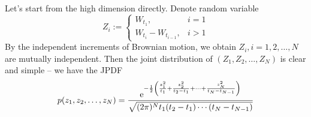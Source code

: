 \documentclass{homework}
\begin{document}
    \problem
    \begin{subproblem}[\roman*)]
        \item
        Let's start from the high dimension directly.
        Denote random variable
        \[Z_i:=\begin{cases}
            W_{t_1},&i=1\\
            W_{t_i}-W_{t_{i-1}},&i>1
        \end{cases}\]
        By the independent increments of Brownian motion, we
        obtain $Z_i,i=1,2,\ldots,N$ are mutually independent.
        Then the joint distribution of $(Z_1,Z_2,\ldots,Z_N)$
        is clear and simple -- we have the JPDF
        \begin{equation*}
            p(z_1,z_2,\ldots,z_N)=
            \frac{\mathrm e^{-\frac{1}{2}\left(
                \frac{z_1^2}{t_1}
                +\frac{z_2^2}{t_2-t_1}
                +\cdots+\frac{z_N^2}{t_N-t_{N-1}}
            \right)}}{\sqrt{(2\pi)^Nt_1(t_2-t_1)\cdots(t_N-t_{N-1})}}
        \end{equation*}


\end{subproblem}
\end{document}
